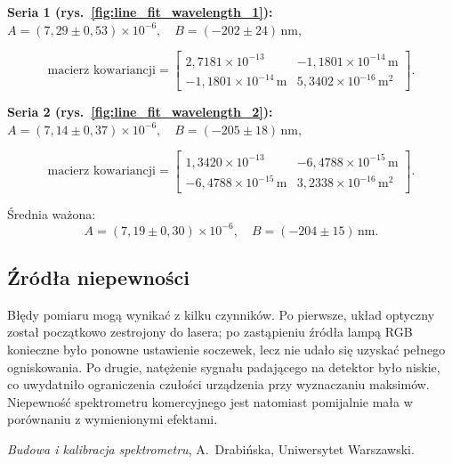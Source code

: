 \documentclass[12pt]{article}
\begin{document}
\textbf{Seria 1 (rys.~\ref{fig:line_fit_wavelength_1}):}  
\(A = (7{,}29 \pm 0{,}53) \times 10^{-6}, \quad B = (-202 \pm 24)\,\mathrm{nm},\)

\[
  \text{macierz kowariancji} =
  \begin{bmatrix}
      2{,}7181 \times 10^{-13} & -1{,}1801 \times 10^{-14}\,\mathrm{m} \\
    -1{,}1801 \times 10^{-14}\,\mathrm{m} & 5{,}3402 \times 10^{-16}\,\mathrm{m}^2
  \end{bmatrix}.
\]

\textbf{Seria 2 (rys.~\ref{fig:line_fit_wavelength_2}):}  
\(A = (7{,}14 \pm 0{,}37) \times 10^{-6}, \quad B = (-205 \pm 18)\,\mathrm{nm},\)

\[
  \text{macierz kowariancji} =
  \begin{bmatrix}
    1{,}3420 \times 10^{-13} & -6{,}4788 \times 10^{-15}\,\mathrm{m} \\
    -6{,}4788 \times 10^{-15}\,\mathrm{m} & 3{,}2338 \times 10^{-16}\,\mathrm{m}^2
  \end{bmatrix}.
\]

Średnia ważona:  
\[
    A = (7{,}19 \pm 0{,}30) \times 10^{-6}, \quad
      B = (-204 \pm 15)\,\mathrm{nm}.
\]

\subsection*{Źródła niepewności}

Błędy pomiaru mogą wynikać z kilku czynników.  
Po pierwsze, układ optyczny został początkowo zestrojony do lasera; po zastąpieniu źródła lampą RGB konieczne było ponowne ustawienie soczewek, lecz nie udało się uzyskać pełnego ogniskowania.  
Po drugie, natężenie sygnału padającego na detektor było niskie, co uwydatniło ograniczenia czułości urządzenia przy wyznaczaniu maksimów.  
Niepewność spektrometru komercyjnego jest natomiast pomijalnie mała w porównaniu z wymienionymi efektami.

\newpage
\begin{thebibliography}{1}

\emph{Budowa i kalibracja spektrometru}, A.~Drabińska, Uniwersytet Warszawski.

\end{thebibliography}
\end{document}

